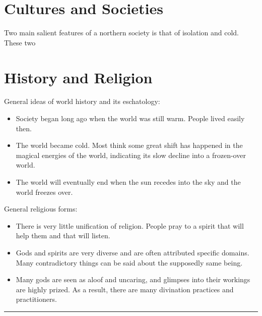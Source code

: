 \documentclass[notitlepage]{article}
\begin{document}
\begin{multicols}{2}
\section{Cultures and Societies}

Two main salient features of a northern society is that of isolation and cold.
These two 


\section{History and Religion}

General ideas of world history and its eschatology:

\begin{itemize}
\item Society began long ago when the world was still warm. People lived easily then.
\item The world became cold. Most think some great shift has happened in the magical energies of the world, indicating its slow decline into a frozen-over world.
\item The world will eventually end when the sun recedes into the sky and the world freezes over.
\end{itemize}

General religious forms:

\begin{itemize}
\item There is very little unification of religion. People pray to a spirit that will help them and that will listen.
\item Gods and spirits are very diverse and are often attributed specific domains. Many contradictory things can be said about the supposedly same being.
\item Many gods are seen as aloof and uncaring, and glimpses into their workings are highly prized. As a result, there are many divination practices and practitioners.
\end{itemize}


\hrule

\end{multicols}
\end{document}

